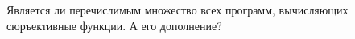 Является ли перечислимым множество всех программ, вычисляющих сюръективные функции. А его дополнение?